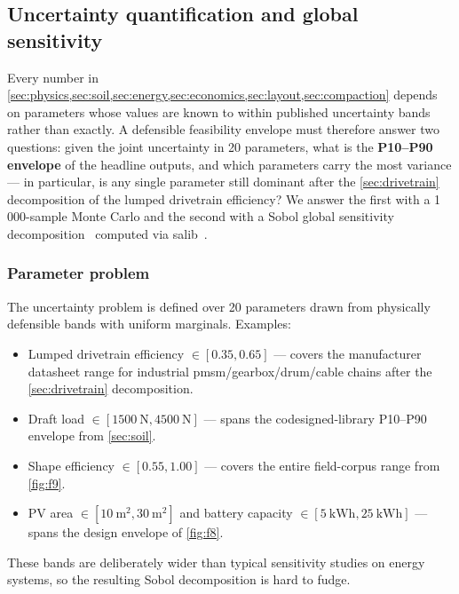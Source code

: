 \documentclass[11pt,a4paper]{article}
\begin{document}
\subsection{Uncertainty quantification and global sensitivity}\label{sec:uq}

Every number in \cref{sec:physics,sec:soil,sec:energy,sec:economics,sec:layout,sec:compaction} depends on parameters whose values are known to within published uncertainty bands rather than exactly. A defensible feasibility envelope must therefore answer two questions: given the joint uncertainty in 20 parameters, what is the \textbf{P10--P90 envelope} of the headline outputs, and which parameters carry the most variance --- in particular, is any single parameter still dominant after the \cref{sec:drivetrain} decomposition of the lumped drivetrain efficiency? We answer the first with a 1\,000-sample Monte Carlo and the second with a Sobol global sensitivity decomposition~\cite{sobol2001indices,saltelli2008primer} computed via \gls{salib}~\cite{herman2017salib,iwanaga2022salib}.

\subsubsection{Parameter problem}\label{sec:uq-problem}

The uncertainty problem is defined over 20 parameters drawn from physically defensible bands with uniform marginals. Examples:

\begin{itemize}[leftmargin=1.6em,itemsep=0.1em]
    \item Lumped drivetrain efficiency $\in [0.35, 0.65]$ --- covers the manufacturer datasheet range for industrial \gls{pmsm}/gearbox/drum/cable chains after the \cref{sec:drivetrain} decomposition.
    \item Draft load $\in [\SI{1500}{\newton}, \SI{4500}{\newton}]$ --- spans the codesigned-library P10--P90 envelope from \cref{sec:soil}.
    \item Shape efficiency $\in [0.55, 1.00]$ --- covers the entire field-corpus range from \cref{fig:f9}.
    \item PV area $\in [\SI{10}{\meter\squared}, \SI{30}{\meter\squared}]$ and battery capacity $\in [\SI{5}{\kWh}, \SI{25}{\kWh}]$ --- spans the design envelope of \cref{fig:f8}.
\end{itemize}

These bands are deliberately wider than typical sensitivity studies on energy systems, so the resulting Sobol decomposition is hard to fudge.
\end{document}
